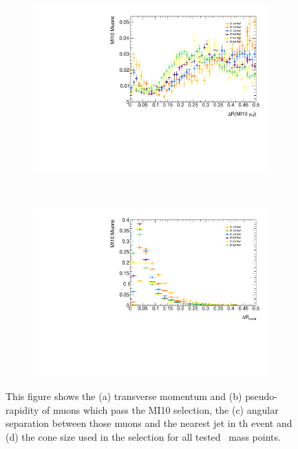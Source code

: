 \begin{figure}[t]
\begin{subfigure}{0.49\linewidth}
\includegraphics[width=\textwidth]{PartBoosted/Plots/h_mi10_jet_dr.pdf}
\end{subfigure}
~
\begin{subfigure}{0.49\linewidth}
\includegraphics[width=\textwidth]{PartBoosted/Plots/h_mi10_coneSize.pdf}
\end{subfigure}

\caption{This figure shows the (a) transverse momentum and (b) pseudo-rapidity of muons which pass the MI10 selection, the (c) angular separation between those muons and the nearest jet in th event and (d) the cone size used in the selection for all tested \Zprime\ mass points.} \label{fig:BoostedControlSMT}
\end{figure}

